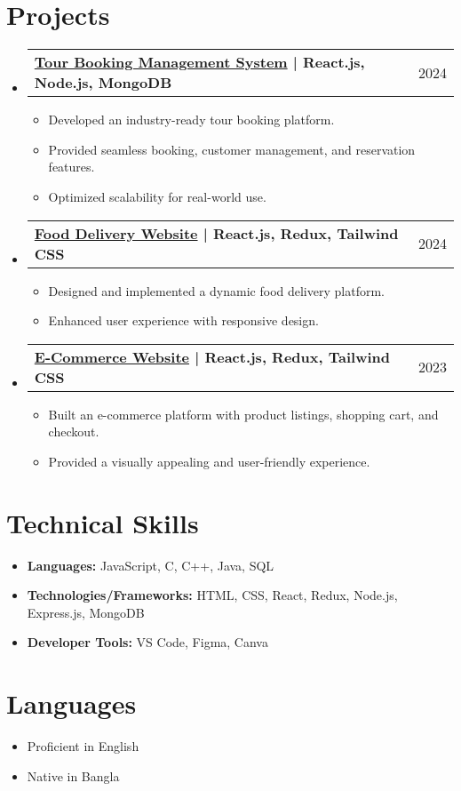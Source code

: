 \documentclass[letterpaper,11pt]{article}
\makeatletter
\newcommand{\resumeProjectHeading}[2]{
  \item
  \begin{tabular*}{\textwidth}{l@{\extracolsep{\fill}}r}
    \textbf{#1} & #2 \\
  \end{tabular*}\vspace{-5pt}
}
\newcommand{\resumeItem}[1]{\item \small{#1\vspace{-2pt}}}
\newcommand{\resumeSubHeadingListStart}{\begin{itemize}[leftmargin=0in, label={}]}
\newcommand{\resumeSubHeadingListEnd}{\end{itemize}}
\newcommand{\resumeItemListStart}{\begin{itemize}[label={-}]}
\newcommand{\resumeItemListEnd}{\end{itemize}}
\makeatother
\begin{document}
\section{Projects}
  \resumeSubHeadingListStart
    \resumeProjectHeading
      {\href{#}{Tour Booking Management System} | React.js, Node.js, MongoDB}{2024}
      \resumeItemListStart
        \resumeItem{Developed an industry-ready tour booking platform.}
        \resumeItem{Provided seamless booking, customer management, and reservation features.}
        \resumeItem{Optimized scalability for real-world use.}
      \resumeItemListEnd
    \resumeProjectHeading
      {\href{https://github.com/md-shafiuddin-shajib/Food-Delivery.git}{Food Delivery Website} | React.js, Redux, Tailwind CSS}{2024}
      \resumeItemListStart
        \resumeItem{Designed and implemented a dynamic food delivery platform.}
        \resumeItem{Enhanced user experience with responsive design.}
      \resumeItemListEnd
    \resumeProjectHeading
      {\href{https://github.com/md-shafiuddin-shajib/Ecommer-react.git}{E-Commerce Website} | React.js, Redux, Tailwind CSS}{2023}
      \resumeItemListStart
        \resumeItem{Built an e-commerce platform with product listings, shopping cart, and checkout.}
        \resumeItem{Provided a visually appealing and user-friendly experience.}
      \resumeItemListEnd
  \resumeSubHeadingListEnd

\section{Technical Skills}
\small{
\begin{itemize}[leftmargin=0.15in, label={}]
  \item \textbf{Languages:} JavaScript, C, C++, Java, SQL
  \item \textbf{Technologies/Frameworks:} HTML, CSS, React, Redux, Node.js, Express.js, MongoDB
  \item \textbf{Developer Tools:} VS Code, Figma, Canva
\end{itemize}
}

\section{Languages}
\begin{itemize}[itemsep=0pt]
    \item Proficient in English
    \item Native in Bangla
\end{itemize}
\end{document}
